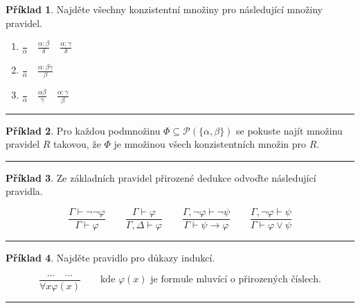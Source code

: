 \documentclass[a4paper]{article}
\theoremstyle{definition}
\newtheorem{priklad}{Příklad}
\begin{document}
\begin{priklad}
    Najděte všechny konzistentní množiny pro následující množiny pravidel.
    
    \begin{enumerate}
      \item $\displaystyle \frac{}{\alpha} \quad \frac{\alpha:\beta}{\delta} \quad \frac{\alpha:\gamma}{\delta}$
      \item $\displaystyle \frac{}{\alpha} \quad \frac{\alpha:\beta\gamma}{\beta}$
      \item $\displaystyle \frac{}{\alpha} \quad \frac{\alpha\beta}{\gamma} \quad \frac{\alpha:\gamma}{\beta}$
    \end{enumerate}
    
\noindent\rule{\linewidth}{.2pt}    
\end{priklad}

\begin{priklad}
    Pro každou podmnožinu $ \Phi\subseteq \mathcal{P}(\{\alpha,\beta\}) $ se pokuste najít množinu pravidel $ R $ takovou, že $ \Phi $ je množinou všech konzistentních množin pro $ R $.
    
\noindent\rule{\linewidth}{.2pt}    
\end{priklad}

\begin{priklad}
    Ze základních pravidel přirozené dedukce odvoďte následující pravidla.
    
    \[
    \frac{\Gamma\vdash \neg\neg\varphi}{\Gamma\vdash\varphi} \qquad 
    \frac{\Gamma\vdash \varphi}{\Gamma,\Delta\vdash\varphi} \qquad
    \frac{\Gamma,\neg\varphi\vdash \neg\psi}{\Gamma\vdash\psi\rightarrow\varphi} \qquad
    \frac{\Gamma,\neg\varphi\vdash \psi}{\Gamma\vdash\varphi\vee\psi}
    \]
    
\noindent\rule{\linewidth}{.2pt}    
\end{priklad}

\begin{priklad}
    Najděte pravidlo pro důkazy indukcí.
    
    \[ \frac{\ldots\quad\ldots}{\forall x\varphi(x)} \qquad \text{kde } \varphi(x) \text{ je formule mluvící o přirozených číslech.} \]
    
\noindent\rule{\linewidth}{.2pt}    
\end{priklad}
\end{document}
